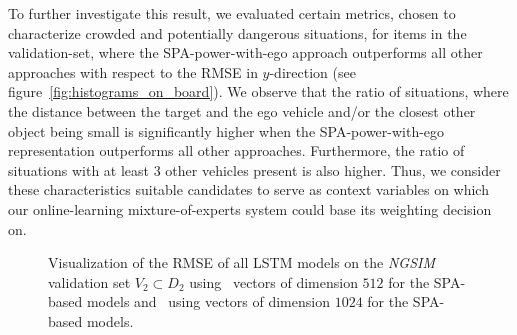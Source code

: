 To further investigate this result, we evaluated certain metrics, chosen to characterize crowded and potentially dangerous situations, for items in the validation-set, where the \ac{SPA}-power-with-ego approach outperforms all other approaches with respect to the \ac{RMSE} in $y$-direction (see figure~\ref{fig:histograms_on_board}).
We observe that the ratio of situations, where the distance between the target and the ego vehicle and/or the closest other object being small is significantly higher when the \ac{SPA}-power-with-ego representation outperforms all other approaches.
Furthermore, the ratio of situations with at least \num{3} other vehicles present is also higher.
Thus, we consider these characteristics suitable candidates to serve as context variables on which our online-learning mixture-of-experts system could base its weighting decision on.
\begin{figure}[t!]
	\centering
    \vspace{-0.3cm}

    \caption{Visualization of the \ac{RMSE} of all \ac{LSTM} models on the \emph{\ac{NGSIM}} validation set $V_2 \subset D_2$ using~\protect{} vectors of dimension $512$ for the \ac{SPA}-based models and~\protect{} using vectors of dimension $1024$ for the \ac{SPA}-based models.}\label{fig:rmse_ngsim_all}

\end{figure}

